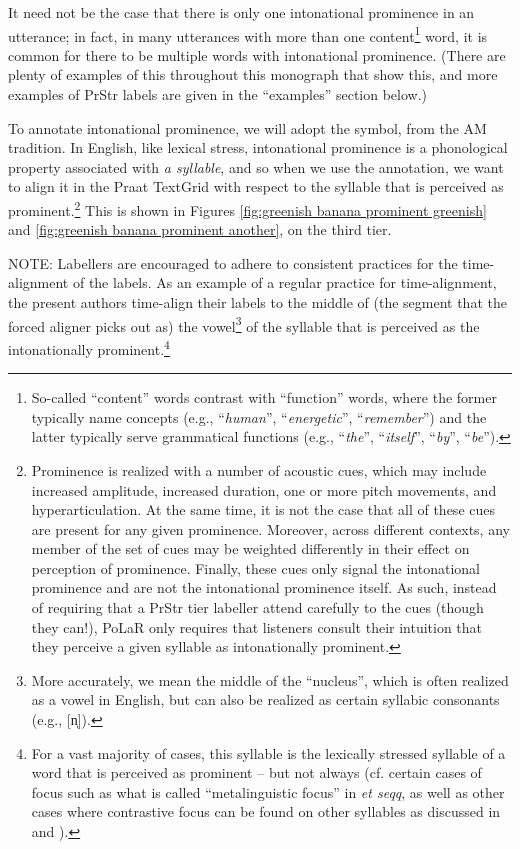 \documentclass[11pt, twoside]{memoir}
\def\textlabel#1{{\relsize{-.5}\fontspec[Mapping=tex-text]{Roboto Mono}{#1}}}
\def\langtext#1{\textit{#1}}
\begin{document}
It need not be the case that there is only one intonational prominence in an utterance; in fact, in many utterances with more than one content\footnote{So-called “content” words contrast with “function” words, where the former typically name concepts (e.g., “\langtext{human}”, “\langtext{energetic}”, “\langtext{remember}”) and the latter typically serve grammatical functions (e.g., “\langtext{the}”, “\langtext{itself}”, “\langtext{by}”, “\langtext{be}”).} word, it is common for there to be multiple words with intonational prominence. (There are plenty of examples of this throughout this monograph that show this, and more examples of PrStr labels are given in the “examples” section below.)

To annotate intonational prominence, we will adopt the \textlabel{*} symbol, from the AM tradition. In English, like lexical stress, intonational prominence is a phonological property associated with \textit{a syllable}, and so when we use the \textlabel{*} annotation, we want to align it in the Praat TextGrid with respect to the syllable that is perceived as prominent.\footnote{Prominence is realized with a number of acoustic cues, which may include increased amplitude, increased duration, one or more pitch movements, and hyperarticulation. At the same time, it is not the case that all of these cues are present for any given prominence. Moreover, across different contexts, any member of the set of cues may be weighted differently in their effect on perception of prominence. Finally, these cues only signal the intonational prominence and are not the intonational prominence itself. As such, instead of requiring that a PrStr tier labeller attend carefully to the cues (though they can!), PoLaR only requires that listeners consult their intuition that they perceive a given syllable as intonationally prominent.\label{fn:prominence cues}} This is shown in Figures \ref{fig:greenish banana prominent greenish} and \ref{fig:greenish banana prominent another}, on the third tier.

NOTE: Labellers are encouraged to adhere to consistent practices for the time-alignment of the \textlabel{*} labels. As an example of a regular practice for time-alignment, the present authors time-align their \textlabel{*} labels to the middle of (the segment that the forced aligner picks out as) the vowel\footnote{More accurately, we mean the middle of the “nucleus”, which is often realized as a vowel in English, but can also be realized as certain syllabic consonants (e.g., [n̩]).} of the syllable that is perceived as the intonationally prominent.\footnote{For a vast majority of cases, this syllable is the lexically stressed syllable of a word that is perceived as prominent – but not always (cf. certain cases of focus such as what is called “metalinguistic focus” in \citealt{erteschik-shir99} \textit{et seqq}, as well as other cases where contrastive focus can be found on other syllables as discussed in \citealt{armstrongschwenter16} and \citealt{ahn-21a}).}
\end{document}
